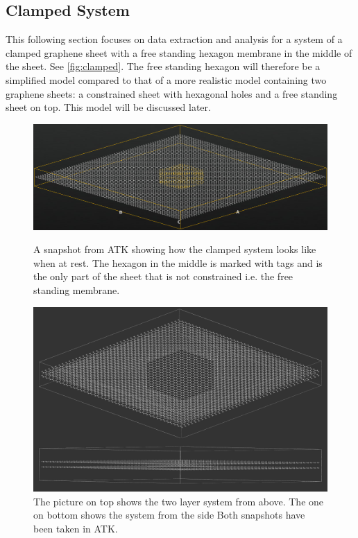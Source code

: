 \subsection{Clamped System}
This following section focuses on data extraction and analysis for a system of a clamped graphene sheet with a free standing hexagon membrane in the middle of the sheet. See \cref{fig:clamped}. The free standing hexagon will therefore be a simplified model compared to that of a more realistic model containing two graphene sheets: a constrained sheet with hexagonal holes and a free standing sheet on top. This model will be discussed later.
\onecolumngrid

\begin{figure}[H]
    \centering
    \includegraphics[width=\columnwidth]{Figures/NanoLayer5nm.png}
    \caption{A snapshot from ATK\cite{QuantumWise} showing how the clamped system looks like when at rest. The hexagon in the middle is marked with tags and is the only part of the sheet that is not constrained i.e. the free standing membrane.}
    \label{fig:clamped}

\vspace{0em}

    \centering
    \includegraphics[width=\columnwidth]{Figures/DoubleMembrane.png}
\caption{The picture on top shows the two layer system from above. The one on bottom shows the system from the side Both snapshots have been taken in ATK\cite{QuantumWise}.}
\label{interlayersys}
\end{figure}
\clearpage
\twocolumngrid

